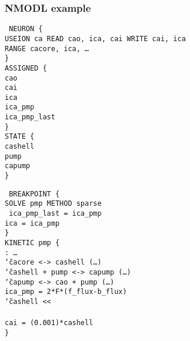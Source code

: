 \documentclass[aspectratio=43,12pt]{beamer}
\newcommand{\ttilde}{\char`\~}
\begin{document}
\begin{frame}
\frametitle{NMODL example}


\colorbox{black!10}{
\begin{minipage}[t][0.6\textheight][t]{0.46\textwidth}
\scriptsize\tt
NEURON \{\\
USEION ca READ {\color<3->{red}cao}, ica, cai WRITE cai, ica\\
RANGE cacore, ica, \dots\\
\}\\
ASSIGNED \{\\
cao\\
cai\\
ica\\
ica\_pmp\\
ica\_pmp\_last\\
\}\\
STATE \{\\
cashell\\
pump\\
capump\\
\}
\end{minipage}}%
\hfill
\colorbox{black!10}{
\begin{minipage}[t][0.6\textheight][t]{0.46\textwidth}
\scriptsize\tt
BREAKPOINT \{\\
SOLVE pmp METHOD sparse\\
{\color<4->{blue}
ica\_pmp\_last = ica\_pmp\\
ica = ica\_pmp}\\
\}\\
KINETIC pmp \{\\
: \dots\\
\ttilde cacore <-> cashell (\dots)\\
\ttilde cashell + pump <-> capump (\dots)\\
\ttilde capump <-> {\color<3->{red}cao} + pump (\dots)\\
ica\_pmp = 2*F*{\color<2->{purple}(f\_flux-b\_flux)}\\
\ttilde cashell <<\\
\\
cai = (0.001)*cashell\\
\}
\end{minipage}}

\end{frame}
\end{document}
